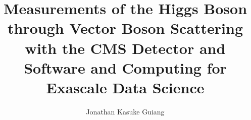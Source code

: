 \documentclass[12pt]{ucsd}
\title{Measurements of the Higgs Boson through Vector Boson Scattering with the CMS Detector and Software and Computing for Exascale Data Science}
\author{Jonathan Kasuke Guiang}
\begin{document}
\frontmatter
\maketitle
\makecopyright
\makesignature





\tableofcontents
\listoffigures
\listoftables









\mainmatter








\appendix




\backmatter

\end{document}

